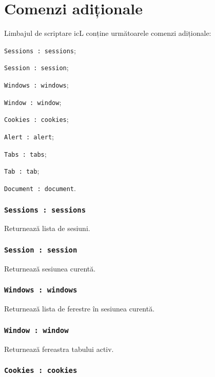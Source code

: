 
\section{Comenzi adiționale}

Limbajul de scriptare icL conține următoarele comenzi adiționale:
\begin{icItems}
	\item \texttt{Sessions : sessions};
	\item \texttt{Session : session};
	\item \texttt{Windows : windows};
	\item \texttt{Window : window};
	\item \texttt{Cookies : cookies};
	\item \texttt{Alert : alert};
	\item \texttt{Tabs : tabs};
	\item \texttt{Tab : tab};
	\item \texttt{Document : document}.
\end{icItems}

\subsubsection{\texttt{Sessions : sessions}}

Returnează lista de sesiuni.

\subsubsection{\texttt{Session : session}}

Returnează sesiunea curentă.

\subsubsection{\texttt{Windows : windows}}

Returnează lista de ferestre în sesiunea curentă.

\subsubsection{\texttt{Window : window}}

Returnează fereastra tabului activ.

\subsubsection{\texttt{Cookies : cookies}}

